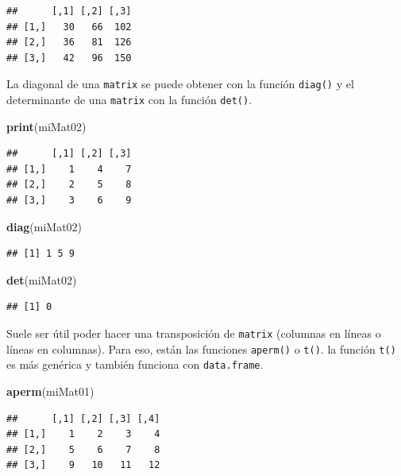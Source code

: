\documentclass[
]{book}
\newenvironment{Shaded}{\begin{snugshade}}{\end{snugshade}}
\newcommand{\KeywordTok}[1]{\textcolor[rgb]{0.13,0.29,0.53}{\textbf{#1}}}
\newcommand{\NormalTok}[1]{#1}
\begin{document}
\begin{verbatim}
##      [,1] [,2] [,3]
## [1,]   30   66  102
## [2,]   36   81  126
## [3,]   42   96  150
\end{verbatim}

La diagonal de una \texttt{matrix} se puede obtener con la función \texttt{diag()} y el determinante de una \texttt{matrix} con la función \texttt{det()}.

\begin{Shaded}
\begin{Highlighting}[]
\KeywordTok{print}\NormalTok{(miMat02)}
\end{Highlighting}
\end{Shaded}

\begin{verbatim}
##      [,1] [,2] [,3]
## [1,]    1    4    7
## [2,]    2    5    8
## [3,]    3    6    9
\end{verbatim}

\begin{Shaded}
\begin{Highlighting}[]
\KeywordTok{diag}\NormalTok{(miMat02)}
\end{Highlighting}
\end{Shaded}

\begin{verbatim}
## [1] 1 5 9
\end{verbatim}

\begin{Shaded}
\begin{Highlighting}[]
\KeywordTok{det}\NormalTok{(miMat02)}
\end{Highlighting}
\end{Shaded}

\begin{verbatim}
## [1] 0
\end{verbatim}

Suele ser útil poder hacer una transposición de \texttt{matrix} (columnas en líneas o líneas en columnas). Para eso, están las funciones \texttt{aperm()} o \texttt{t()}. la función \texttt{t()} es más genérica y también funciona con \texttt{data.frame}.

\begin{Shaded}
\begin{Highlighting}[]
\KeywordTok{aperm}\NormalTok{(miMat01)}
\end{Highlighting}
\end{Shaded}

\begin{verbatim}
##      [,1] [,2] [,3] [,4]
## [1,]    1    2    3    4
## [2,]    5    6    7    8
## [3,]    9   10   11   12
\end{verbatim}
\end{document}
